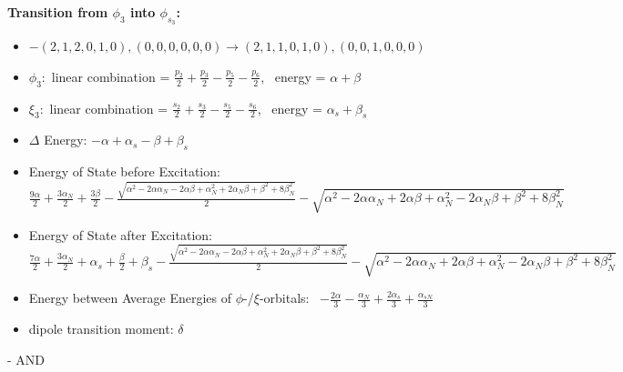 \documentclass[12pt,a4paper]{article}
\begin{document}
        \noindent\textbf{Transition from $\phi_{3}$ into $\phi_{s_{3}}$:}
        \begin{itemize}
            \item $- (2, 1, 2, 0, 1, 0), (0, 0, 0, 0, 0, 0) \rightarrow (2, 1, 1, 0, 1, 0), (0, 0, 1, 0, 0, 0)$
        
            \item $\phi_{3}:$ linear combination = $\frac{p_{2}}{2} + \frac{p_{3}}{2} - \frac{p_{5}}{2} - \frac{p_{6}}{2}$, \
            energy = $\alpha + \beta$
            
            \item $\xi_{3}:$ linear combination = $\frac{s_{2}}{2} + \frac{s_{3}}{2} - \frac{s_{5}}{2} - \frac{s_{6}}{2}$, \
            energy = $\alpha_{s} + \beta_{s}$
            
            \item $\Delta$ Energy: $- \alpha + \alpha_{s} - \beta + \beta_{s}$
            \item Energy of State before Excitation: $\frac{9 \alpha}{2} + \frac{3 \alpha_{N}}{2} + \frac{3 \beta}{2} - \frac{\sqrt{\alpha^{2} - 2 \alpha \alpha_{N} - 2 \alpha \beta + \alpha_{N}^{2} + 2 \alpha_{N} \beta + \beta^{2} + 8 \beta_{N}^{2}}}{2} - \sqrt{\alpha^{2} - 2 \alpha \alpha_{N} + 2 \alpha \beta + \alpha_{N}^{2} - 2 \alpha_{N} \beta + \beta^{2} + 8 \beta_{N}^{2}}$
            \item Energy of State after Excitation: $\frac{7 \alpha}{2} + \frac{3 \alpha_{N}}{2} + \alpha_{s} + \frac{\beta}{2} + \beta_{s} - \frac{\sqrt{\alpha^{2} - 2 \alpha \alpha_{N} - 2 \alpha \beta + \alpha_{N}^{2} + 2 \alpha_{N} \beta + \beta^{2} + 8 \beta_{N}^{2}}}{2} - \sqrt{\alpha^{2} - 2 \alpha \alpha_{N} + 2 \alpha \beta + \alpha_{N}^{2} - 2 \alpha_{N} \beta + \beta^{2} + 8 \beta_{N}^{2}}$
            \item Energy between Average Energies of $\phi$-/$\xi$-orbitals: \
            $- \frac{2 \alpha}{3} - \frac{\alpha_{N}}{3} + \frac{2 \alpha_{s}}{3} + \frac{\alpha_{s N}}{3}$
        
            \item dipole transition moment: $\delta$
        
        \end{itemize}
        
 -  AND 
\end{document}
